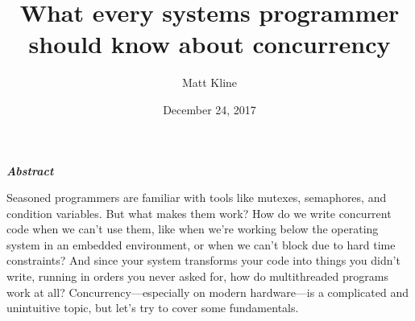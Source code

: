 \documentclass[fontsize=10pt, numbers=endperiod]{scrartcl}
\title{What every systems programmer should know about concurrency}
\author{Matt Kline}
\date{December 24, 2017}
\makeatletter
\let\runauthor\@author
\let\rundate\@date
\let\runtitle\@title
\makeatother
\begin{document}
\begin{center}
\sffamily\Large \textbf{\runtitle}
\bigskip

\large
\runauthor
\smallskip

\normalsize
\rundate
\end{center}
\bigskip

\begin{adjustwidth}{1in}{1in}
\begin{center}
\large \bfseries\itshape Abstract
\end{center}
\smallskip

\noindent
Seasoned programmers are familiar with tools like mutexes, semaphores,
and condition variables.
But what makes them work?
How do we write concurrent code when we can't use them,
like when we're working below the operating system in an embedded environment,
or when we can't block due to hard time constraints?
And since your system transforms your code into things you didn't write,
running in orders you never asked for, how do multithreaded programs work at all?
Concurrency---especially on modern hardware---is a complicated and unintuitive
topic, but let's try to cover some fundamentals.
\bigskip

\tableofcontents
\end{adjustwidth}
\medskip
\end{document}
